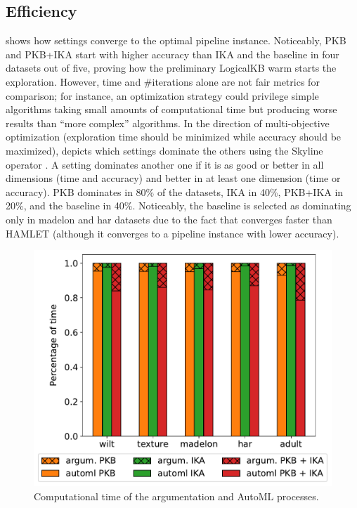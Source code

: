 \subsection{Efficiency}


 shows how settings converge to the optimal pipeline instance.
Noticeably, PKB and PKB+IKA start with higher accuracy than IKA and the baseline in four datasets out of five, proving how the preliminary LogicalKB warm starts the exploration.
However, time and \#iterations alone are not fair metrics for comparison; for instance, an optimization strategy could privilege simple algorithms taking small amounts of computational time but producing worse results than ``more complex'' algorithms.
In the direction of multi-objective optimization (exploration time should be minimized while accuracy should be maximized),  depicts which settings dominate the others using the Skyline operator \cite{borzsony2001skyline}.
A setting dominates another one if it is as good or better in all dimensions (time and accuracy) and better in at least one dimension (time or accuracy).
PKB dominates in 80\% of the datasets, IKA in 40\%, PKB+IKA in 20\%, and the baseline in 40\%.
Noticeably, the baseline is selected as dominating only in madelon and har datasets due to the fact that converges faster than HAMLET (although it converges to a pipeline instance with lower accuracy).


\begin{figure}[t]
    \centering
    \includegraphics[scale=.43]{chapters/human-centric/hamlet/img/time.pdf}
    \caption{Computational time of the argumentation and AutoML processes.}
    \label{fig:effoverhead}
\end{figure}


